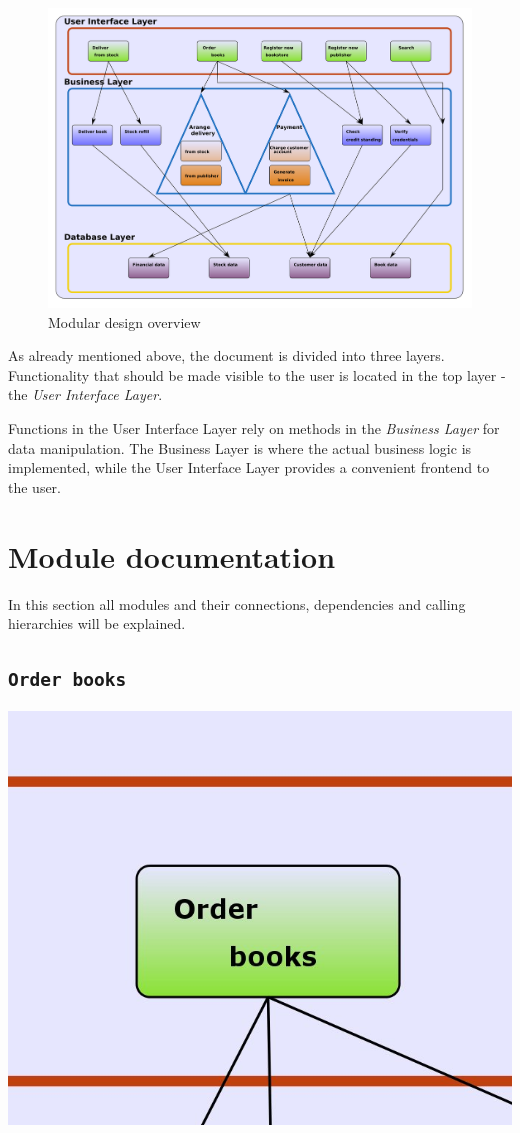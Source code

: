 \begin{figure}[htb]
\centering
\includegraphics[scale=0.70,angle=270]{Modular_design.png}
\caption{Modular design overview}
\end{figure}

As already mentioned above, the document is divided into three layers. Functionality that should be made visible to the user is located in the top layer - the \emph{User Interface Layer}.

Functions in the User Interface Layer rely on methods in the \emph{Business Layer} for data manipulation. The Business Layer is where the actual business logic is implemented, while the User Interface Layer provides a convenient frontend to the user.
\chapter{Module documentation}
In this section all modules and their connections, dependencies and calling hierarchies will be explained.

\section{\texttt{Order books}}

\includegraphics[scale=0.8]{screenshots/Order_book.jpeg}

